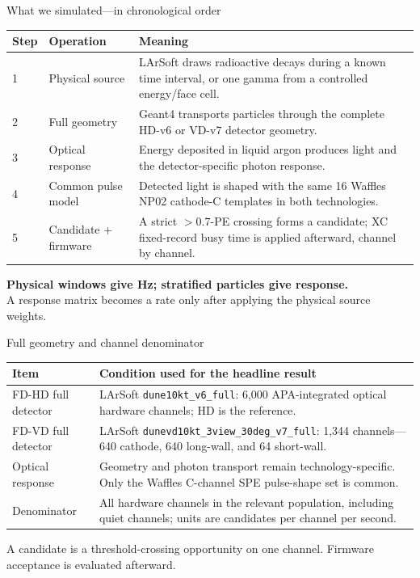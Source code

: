 \documentclass[aspectratio=169,11pt]{beamer}
\begin{document}
\begin{frame}{What we simulated---in chronological order}
  \footnotesize
  \setlength{\tabcolsep}{4pt}
  \renewcommand{\arraystretch}{1.05}
  \begin{tabular}{@{}p{}p{}p{}@{}}
    \toprule
    Step & Operation & Meaning \\
    \midrule
    1 & Physical source & LArSoft draws radioactive decays during a known time interval, or one gamma from a controlled energy/face cell. \\
    2 & Full geometry & Geant4 transports particles through the complete HD-v6 or VD-v7 detector geometry. \\
    3 & Optical response & Energy deposited in liquid argon produces light and the detector-specific photon response. \\
    4 & Common pulse model & Detected light is shaped with the same 16 Waffles NP02 cathode-C templates in both technologies. \\
    5 & Candidate + firmware & A strict $>0.7$-PE crossing forms a candidate; XC fixed-record busy time is applied afterward, channel by channel. \\
    \bottomrule
  \end{tabular}

  \smallskip
  \centering
  \textbf{Physical windows give Hz; stratified particles give response.}\\
  A response matrix becomes a rate only after applying the physical source weights.
\end{frame}

\begin{frame}{Full geometry and channel denominator}
  \footnotesize
  \setlength{\tabcolsep}{4pt}
  \renewcommand{\arraystretch}{1.20}
  \begin{tabular}{@{}p{}p{}@{}}
    \toprule
    Item & Condition used for the headline result \\
    \midrule
    FD-HD full detector & LArSoft \texttt{dune10kt\_v6\_full}: 6,000 APA-integrated optical hardware channels; HD is the reference. \\
    FD-VD full detector & LArSoft \texttt{dunevd10kt\_3view\_30deg\_v7\_full}: 1,344 channels---640 cathode, 640 long-wall, and 64 short-wall. \\
    Optical response & Geometry and photon transport remain technology-specific. Only the Waffles C-channel SPE pulse-shape set is common. \\
    Denominator & All hardware channels in the relevant population, including quiet channels; units are candidates per channel per second. \\
    \bottomrule
  \end{tabular}

  \smallskip
    {A candidate is a threshold-crossing opportunity on one channel. Firmware acceptance is evaluated afterward.}
\end{frame}
\end{document}
